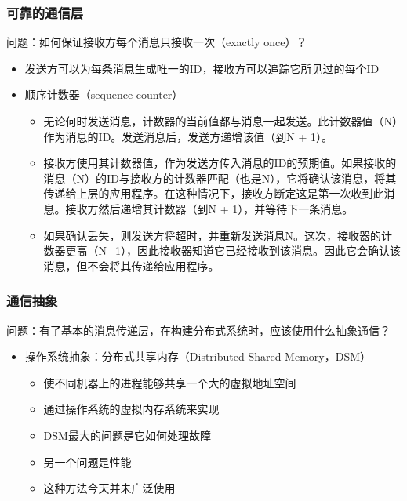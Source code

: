 \begin{frame}[fragile]
    \frametitle{可靠的通信层}
    问题：如何保证接收方每个消息只接收一次（exactly once）？
    \begin{itemize}
        \item 发送方可以为每条消息生成唯一的ID，接收方可以追踪它所见过的每个ID
        \item  顺序计数器（sequence counter）
            \begin{itemize}
            \item 无论何时发送消息，计数器的当前值都与消息一起发送。此计数器值（N）作为消息的ID。发送消息后，发送方递增该值（到N + 1）。
            \item 接收方使用其计数器值，作为发送方传入消息的ID的预期值。如果接收的消息（N）的ID与接收方的计数器匹配（也是N），它将确认该消息，将其传递给上层的应用程序。在这种情况下，接收方断定这是第一次收到此消息。接收方然后递增其计数器（到N + 1），并等待下一条消息。
            \item 如果确认丢失，则发送方将超时，并重新发送消息N。这次，接收器的计数器更高（N+1），因此接收器知道它已经接收到该消息。因此它会确认该消息，但不会将其传递给应用程序。
            \end{itemize}
    \end{itemize}
    
\end{frame}

\begin{frame}[fragile]
    \frametitle{通信抽象}
    问题：有了基本的消息传递层，在构建分布式系统时，应该使用什么抽象通信？
    \begin{itemize}
        \item 操作系统抽象：分布式共享内存（Distributed Shared Memory，DSM）
                    \begin{itemize}
            \item 使不同机器上的进程能够共享一个大的虚拟地址空间
            \item 通过操作系统的虚拟内存系统来实现
            \item DSM最大的问题是它如何处理故障
            \item 另一个问题是性能
            \item 这种方法今天并未广泛使用
        \end{itemize}
    \end{itemize}
    
\end{frame}

